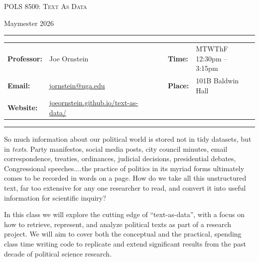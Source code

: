 \documentclass[11pt, letterpaper]{article}
\begin{document}
\begin{center}
{\Large \textsc{POLS 8500: Text As Data}}
\end{center}
\begin{center}
{\large Maymester 2026}
\end{center}

\begin{center}
\rule{6.5in}{0.4pt}
\begin{minipage}[t]{.96\textwidth}
\begin{tabular}{llcccll}
\textbf{Professor:} & Joe Ornstein & & &  & \textbf{Time:} & MTWThF 12:30pm -- 3:15pm \\
\textbf{Email:} &  \href{mailto:jornstein@uga.edu}{jornstein@uga.edu} & & & & \textbf{Place:} & 101B Baldwin Hall\\
\textbf{Website:} & \href{https://joeornstein.github.io/text-as-data/}{joeornstein.github.io/text-as-data/} & & & & &
\end{tabular}
\end{minipage}
\rule{6.5in}{0.4pt}
\end{center}
\vspace{.15cm}
\setlength{\unitlength}{1in}
\renewcommand{\arraystretch}{2}


\noindent So much information about our political world is stored not in tidy datasets, but in \textit{texts}. Party manifestos, social media posts, city council minutes, email correspondence, treaties, ordinances, judicial decisions, presidential debates, Congressional speeches....the practice of politics in its myriad forms ultimately comes to be recorded in words on a page. How do we take all this unstructured text, far too extensive for any one researcher to read, and convert it into useful information for scientific inquiry?

In this class we will explore the cutting edge of ``text-as-data'', with a focus on how to retrieve, represent, and analyze political texts as part of a research project. We will aim to cover both the conceptual and the practical, spending class time writing code to replicate and extend significant results from the past decade of political science research.


\end{document}
